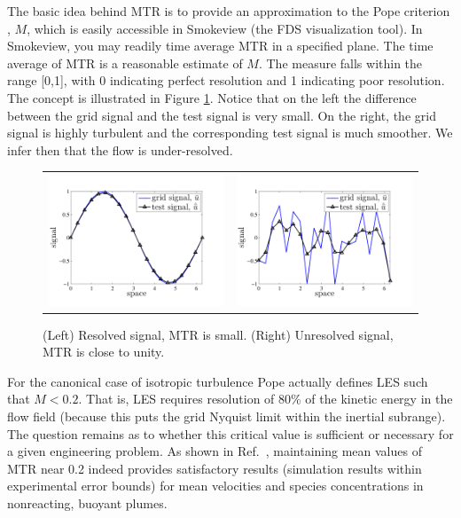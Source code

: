 \documentclass[11pt]{book}
\begin{document}
The basic idea behind MTR is to provide an approximation to the Pope criterion \cite{Pope:2004}, $M$, which is easily accessible in Smokeview (the FDS visualization tool).  In Smokeview, you may readily time average MTR in a specified plane.  The time average of MTR is a reasonable estimate of $M$.  The measure falls within the range [0,1], with 0 indicating perfect resolution and 1 indicating poor resolution.  The concept is illustrated in Figure \ref{fig_mtr}. Notice that on the left the difference between the grid signal and the test signal is very small.  On the right, the grid signal is highly turbulent and the corresponding test signal is much smoother.  We infer then that the flow is under-resolved.
\begin{figure}[ht]
\centering
\begin{tabular}{rl}
\includegraphics[width=3.2in]{FIGURES/mtr_resolved_signal} &
\includegraphics[width=3.2in]{FIGURES/mtr_unresolved_signal}
\end{tabular}
\vskip-0.2cm
\caption[Examples of the measure of turbulence resolution]{(Left) Resolved signal, MTR is small. (Right) Unresolved signal, MTR is close to unity.}
\label{fig_mtr}
\end{figure}

For the canonical case of isotropic turbulence Pope actually defines LES such that $M<0.2$.  That is, LES requires resolution of 80\% of the kinetic energy in the flow field (because this puts the grid Nyquist limit within the inertial subrange).  The question remains as to whether this critical value is sufficient or necessary for a given engineering problem.  As shown in Ref.~\cite{McDermott:2010}, maintaining mean values of MTR near 0.2 indeed provides satisfactory results (simulation results within experimental error bounds) for mean velocities and species concentrations in nonreacting, buoyant plumes.
\end{document}
